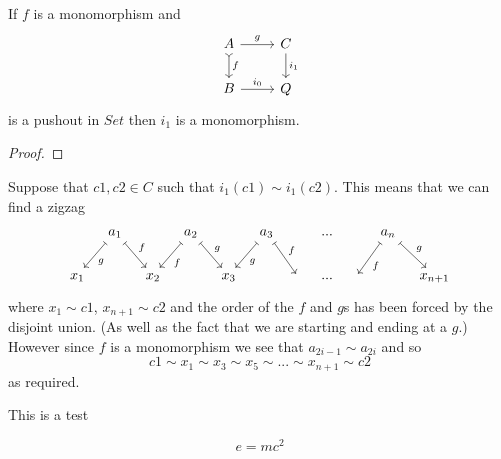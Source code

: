\message{ !name(talk2018-03-05.tex)}\documentclass{article}
\begin{document}
\begin{lemma}\label{lem:pushout-of-mono-2}
  If $f$ is a monomorphism and
  \begin{equation*}
    \begin{tikzcd}
     A \rar{g} \dar[rightarrowtail]{f} & C\dar{i_1}\\
     B \rar{i_0} & Q
    \end{tikzcd}
  \end{equation*}
  is a pushout in $Set$ then $i_1$ is a monomorphism.
  \begin{proof}

  \end{proof}
  Suppose that $c1,c2\in C$ such that $i_1(c1)\sim i_1(c2)$.
  This means that we can find a zigzag
  \begin{equation*}
    \begin{tikzcd}[column sep=0.3cm]
      {} & a_1 \dlar[mapsto]{g} \drar[mapsto]{f} & {} & a_2 \dlar[mapsto]{f} \drar[mapsto]{g}& {} & a_3 \dlar[mapsto]{g}\drar[mapsto]{f} &{} &...& & a_n \dlar[mapsto]{f}\drar[mapsto]{g} &{} \\
      x_1 & {} & x_2 & {} & x_3 & {} & {} & ...& {}  & {} & x_{n+1}
    \end{tikzcd}
  \end{equation*}
  where $x_1\sim c1$, $x_{n+1}\sim c2$ and the order of the $f$ and $g$s has been forced by the disjoint union.
  (As well as the fact that we are starting and ending at a $g$.)
  However since $f$ is a monomorphism we see that $a_{2i-1}\sim a_{2i}$ and so
  \begin{equation*}
    c1 \sim x_1 \sim x_3 \sim x_5 \sim ... \sim x_{n+1}\sim c2
  \end{equation*}
  as required.
\end{lemma}

This is a test

\begin{equation*}
  e=mc^2
\end{equation*}




\end{document}

